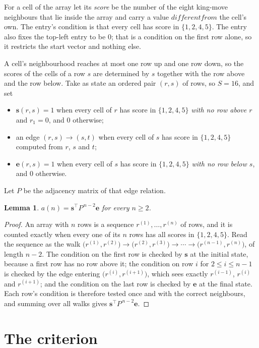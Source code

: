 \documentclass[11pt,a4paper]{article}
\theoremstyle{plain}
\newtheorem{lemma}[theorem]{Lemma}
\theoremstyle{definition}
\begin{document}
For a cell of the array let its \emph{score} be the number of the eight king-move neighbours that lie inside
the array and carry a value $different from$ the cell's own. The entry's condition is that every cell
has score in $\{1,2,4,5\}$. The entry also fixes the top-left entry to be $0$; that is a condition on the first row alone, so it restricts the start vector and nothing else.

A cell's neighbourhood reaches at most one row up and one row down, so the scores of the
cells of a row $s$ are determined by $s$ together with the row above and the row below.
Take as state an ordered pair $(r,s)$ of rows, so $S=16$, and set
\begin{itemize}
\item $\mathbf{s}(r,s)=1$ when every cell of $r$ has score in $\{1,2,4,5\}$ \emph{with no row
above $r$} and $r_1=0$, and $0$ otherwise;
\item an edge $(r,s)\to(s,t)$ when every cell of $s$ has score in $\{1,2,4,5\}$ computed from
$r$, $s$ and $t$;
\item $\mathbf{e}(r,s)=1$ when every cell of $s$ has score in $\{1,2,4,5\}$ \emph{with no row
below $s$}, and $0$ otherwise.
\end{itemize}
Let $P$ be the adjacency matrix of that edge relation.

\begin{lemma}\label{lem:walk}
$a(n)=\mathbf{s}^{\!\top}P^{\,n-2}\mathbf{e}$ for every $n\ge2$.
\end{lemma}

\begin{proof}
An array with $n$ rows is a sequence $r^{(1)},\dots,r^{(n)}$ of rows, and it is counted
exactly when every one of its $n$ rows has all scores in $\{1,2,4,5\}$. Read the sequence as the
walk $\bigl(r^{(1)},r^{(2)}\bigr)\to\bigl(r^{(2)},r^{(3)}\bigr)\to\cdots\to
\bigl(r^{(n-1)},r^{(n)}\bigr)$, of length $n-2$. The condition on the first row is
checked by $\mathbf{s}$ at the initial state, because a first row has no row above it; the
condition on row $i$ for $2\le i\le n-1$ is checked by the edge entering
$\bigl(r^{(i)},r^{(i+1)}\bigr)$, which sees exactly $r^{(i-1)}$, $r^{(i)}$ and
$r^{(i+1)}$; and the condition on the last row is checked by $\mathbf{e}$ at the final
state. Each row's condition is therefore tested once and with the correct neighbours, and
summing over all walks gives $\mathbf{s}^{\!\top}P^{\,n-2}\mathbf{e}$.
\end{proof}

\section{The criterion}
\end{document}
